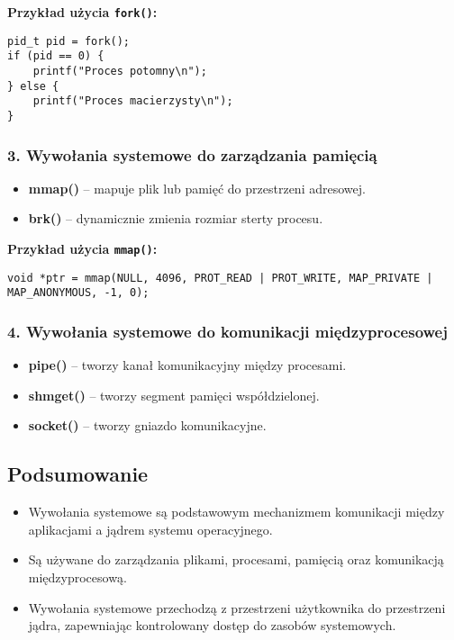 \textbf{Przykład użycia \texttt{fork()}:}
\begin{verbatim}
pid_t pid = fork();
if (pid == 0) {
    printf("Proces potomny\n");
} else {
    printf("Proces macierzysty\n");
}
\end{verbatim}

\subsubsection{3. Wywołania systemowe do zarządzania pamięcią}
\begin{itemize}
    \item \textbf{mmap()} – mapuje plik lub pamięć do przestrzeni adresowej.
    \item \textbf{brk()} – dynamicznie zmienia rozmiar sterty procesu.
\end{itemize}

\textbf{Przykład użycia \texttt{mmap()}:}
\begin{verbatim}
void *ptr = mmap(NULL, 4096, PROT_READ | PROT_WRITE, MAP_PRIVATE | MAP_ANONYMOUS, -1, 0);
\end{verbatim}

\subsubsection{4. Wywołania systemowe do komunikacji międzyprocesowej}
\begin{itemize}
    \item \textbf{pipe()} – tworzy kanał komunikacyjny między procesami.
    \item \textbf{shmget()} – tworzy segment pamięci współdzielonej.
    \item \textbf{socket()} – tworzy gniazdo komunikacyjne.
\end{itemize}

\subsection{Podsumowanie}
\begin{itemize}
    \item Wywołania systemowe są podstawowym mechanizmem komunikacji między aplikacjami a jądrem systemu operacyjnego.
    \item Są używane do zarządzania plikami, procesami, pamięcią oraz komunikacją międzyprocesową.
    \item Wywołania systemowe przechodzą z przestrzeni użytkownika do przestrzeni jądra, zapewniając kontrolowany dostęp do zasobów systemowych.
\end{itemize}
